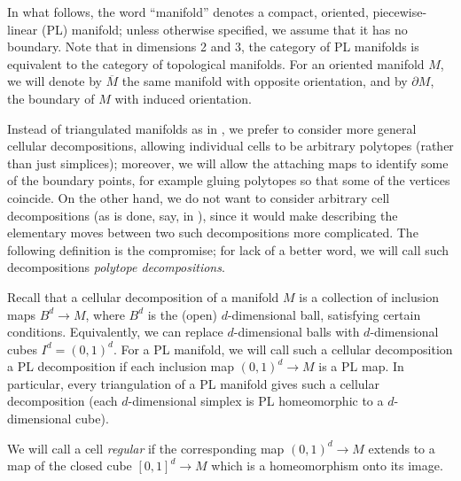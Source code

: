 \documentclass{amsart}
\theoremstyle{definition}
\theoremstyle{remark}
\numberwithin{equation}{section}
\newcommand{\ov}{\overline}
\newcommand{\del}{\partial}
\newcommand{\<}{\langle}
\renewcommand{\>}{\rangle}
\begin{document}
In what follows, the word ``manifold'' denotes a compact, oriented,
piecewise-linear (PL) manifold; unless otherwise specified, we assume that
it has no boundary. Note that in dimensions 2 and 3, the category of PL
manifolds is equivalent to the category of topological manifolds. For an 
oriented manifold $M$, we will denote by $\ov{M}$ the same manifold with
opposite orientation, and by $\del M$, the boundary of $M$ with induced
orientation. 

Instead of triangulated manifolds as in , we prefer to
consider more general cellular decompositions, allowing individual
cells to be arbitrary polytopes (rather than just simplices); moreover,  
we will allow the attaching maps to identify some of the boundary points,
for example gluing polytopes so that some of the vertices coincide.
On the other hand, we do not want to consider arbitrary cell
decompositions (as is done, say, in ), since it would make
describing the  elementary moves between two such decompositions more
complicated.  The following definition is the compromise; for lack of a
better word,   we will call such decompositions {\em polytope
decompositions}.

Recall that a cellular decomposition of a manifold $M$ is a collection 
of inclusion maps $B^d\to M$, where $B^d$ is the (open) $d$-dimensional
ball, satisfying certain conditions. Equivalently, we can replace
$d$-dimensional balls with $d$-dimensional cubes $I^d=(0,1)^d$. For a PL
manifold, we will call such a cellular decomposition a PL  decomposition 
if each inclusion map  $(0,1)^d\to M$ is a PL map. In particular, every
triangulation of a PL  manifold gives such a cellular decomposition (each
$d$-dimensional simplex is PL homeomorphic  to a $d$-dimensional cube).  

We will call a cell {\em regular} if the corresponding map $(0,1)^d\to M$
extends to a map of the closed cube $[0,1]^d\to M$ which is a
homeomorphism onto its image. 
\end{document}
